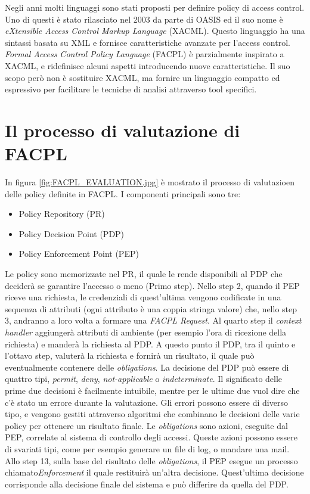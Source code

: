 Negli anni molti linguaggi sono stati proposti per definire policy di access control. Uno di questi è stato rilasciato nel 2003 da parte di OASIS ed il suo nome è \textit{eXtensible Access Control Markup Language} (XACML). Questo linguaggio ha una sintassi basata su XML e fornisce caratteristiche avanzate per l'access control. \textit{Formal Access Control Policy Language} (FACPL) è parzialmente inspirato a XACML, e ridefinisce alcuni aspetti introducendo nuove caratteristiche. Il suo scopo però non è sostituire XACML, ma fornire un linguaggio compatto ed espressivo per facilitare le tecniche di analisi attraverso tool specifici.

\section{Il processo di valutazione di FACPL}
\label{sec:valutazione_facpl}


In figura \ref{fig:FACPL_EVALUATION.jpg} è mostrato il processo di valutazioen delle policy definite in FACPL.
I componenti principali sono tre:
\begin{itemize}
\item{Policy Repository (PR)}
\item{Policy Decision Point (PDP)}
\item{Policy Enforcement Point (PEP)}
\end{itemize}
Le policy sono memorizzate nel PR, il quale le rende disponibili al PDP che deciderà se garantire l'accesso o meno (Primo step).
Nello step 2, quando il PEP riceve una richiesta, le credenziali di quest'ultima vengono codificate in una sequenza di attributi (ogni attributo è una coppia stringa valore) che, nello step 3, andranno a loro volta a formare una \textit{FACPL Request}.
Al quarto step il \textit{context handler} aggiungerà attributi di ambiente (per esempio l'ora di ricezione della richiesta) e manderà la richiesta al PDP.
A questo punto il PDP, tra il quinto e l'ottavo step, valuterà la richiesta e fornirà un risultato, il quale può eventualmente contenere delle \textit{obligations}.
La decisione del PDP può essere di quattro tipi, \textit{permit}, \textit{deny}, \textit{not-applicable} o \textit{indeterminate}.
Il significato delle prime due decisioni è facilmente intuibile, mentre per le ultime due vuol dire che c'è stato un errore durante la valutazione.
Gli errori possono essere di diverso tipo, e vengono gestiti attraverso algoritmi che combinano le decisioni delle varie policy per ottenere un risultato finale.
Le \textit{obligations} sono azioni, eseguite dal PEP, correlate al sistema di controllo degli accessi. Queste azioni possono essere di svariati tipi, come per esempio generare un file di log, o mandare una mail.
Allo step 13, sulla base del risultato delle \textit{obligations}, il PEP esegue un processo chiamato\textit{Enforcement} il quale restituirà un'altra decisione.
Quest'ultima decisione corrisponde alla decisione finale del sistema e può differire da quella del PDP.


